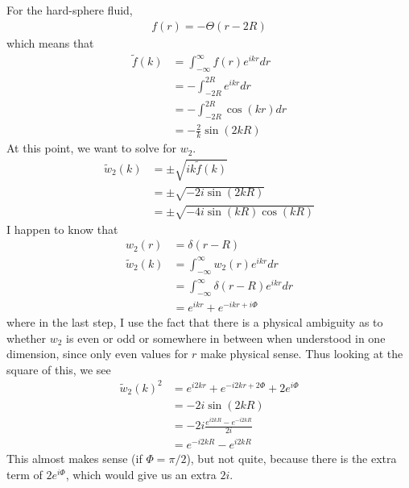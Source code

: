 \documentclass[letterpaper,twocolumn,amsmath,amssymb,prb]{revtex4-1}
\begin{document}
For the hard-sphere fluid,
\begin{align}
  f(r) = - \Theta(r - 2R)
\end{align}
which means that
\begin{align}
  \tilde{f}(k) &= \int_{-\infty}^\infty f(r) e^{ikr} dr \\
  &= -\int_{-2R}^{2R} e^{ikr} dr \\
  &= -\int_{-2R}^{2R} \cos(kr) dr \\
  &= -\frac{2}{k}\sin(2kR)
\end{align}
At this point, we want to solve for $w_2$.
\begin{align}
  \tilde{w}_2(k) &= \pm \sqrt{ik\tilde{f}(k)} \\
  &= \pm \sqrt{-2i\sin(2kR)} \\
  &= \pm \sqrt{-4i\sin(kR)\cos(kR)}
\end{align}
I happen to know that
\begin{align}
  w_2(r) &= \delta(r - R) \\
  \tilde{w}_2(k) &= \int_{-\infty}^\infty w_2(r) e^{ikr} dr \\
  &= \int_{-\infty}^\infty \delta(r-R) e^{ikr} dr \\
  &= e^{ikr} + e^{-ikr + i\Phi}
\end{align}
where in the last step, I use the fact that there is a physical
ambiguity as to whether $w_2$ is even or odd or somewhere in between
when understood in one dimension, since only even values for $r$ make
physical sense.  Thus looking at the square of this, we see
\begin{align}
  \tilde{w}_2(k)^2 &= e^{i2kr} + e^{-i2kr + 2\Phi} + 2e^{i\Phi} \\
  &= -2i\sin(2kR) \\
  &= -2i\frac{e^{i2kR} - e^{-i2kR}}{2i} \\
  &= e^{-i2kR} - e^{i2kR}
\end{align}
This almost makes sense (if $\Phi = \pi/2$), but not quite, because
there is the extra term of $2e^{i\Phi}$, which would give us an extra
$2i$.
\end{document}
